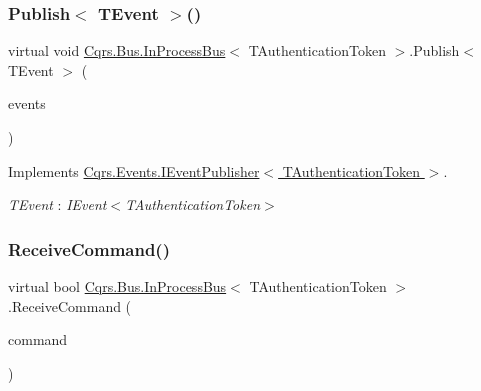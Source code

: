 \subsubsection{\texorpdfstring{Publish$<$ T\+Event $>$()}{Publish< TEvent >()}\hspace{0.1cm}{\footnotesize\ttfamily [2/2]}}
{\footnotesize\ttfamily virtual void \hyperlink{classCqrs_1_1Bus_1_1InProcessBus}{Cqrs.\+Bus.\+In\+Process\+Bus}$<$ T\+Authentication\+Token $>$.Publish$<$ T\+Event $>$ (\begin{DoxyParamCaption}\item[{I\+Enumerable$<$ T\+Event $>$}]{events }\end{DoxyParamCaption})\hspace{0.3cm}{\ttfamily [virtual]}}



Implements \hyperlink{interfaceCqrs_1_1Events_1_1IEventPublisher_a2cbcc3d2c24d015abef6337714ec51ff}{Cqrs.\+Events.\+I\+Event\+Publisher$<$ T\+Authentication\+Token $>$}.

\begin{Desc}
\item[Type Constraints]\begin{description}
\item[{\em T\+Event} : {\em I\+Event$<$T\+Authentication\+Token$>$}]\end{description}
\end{Desc}
\mbox{\label{classCqrs_1_1Bus_1_1InProcessBus_afa5b4def79709baa28fbd15c215a4111}} 
\subsubsection{\texorpdfstring{Receive\+Command()}{ReceiveCommand()}}
{\footnotesize\ttfamily virtual bool \hyperlink{classCqrs_1_1Bus_1_1InProcessBus}{Cqrs.\+Bus.\+In\+Process\+Bus}$<$ T\+Authentication\+Token $>$.Receive\+Command (\begin{DoxyParamCaption}\item[{\hyperlink{interfaceCqrs_1_1Commands_1_1ICommand}{I\+Command}$<$ T\+Authentication\+Token $>$}]{command }\end{DoxyParamCaption})\hspace{0.3cm}{\ttfamily [virtual]}}

